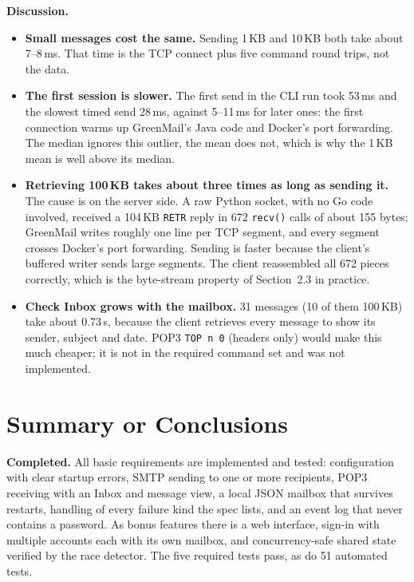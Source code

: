 \documentclass[11pt,a4paper]{article}
\begin{document}
\textbf{Discussion.}
\begin{itemize}
  \item \textbf{Small messages cost the same.} Sending 1\,KB and 10\,KB both take about
        7--8\,ms. That time is the TCP connect plus five command round trips, not the data.
  \item \textbf{The first session is slower.} The first send in the CLI run took 53\,ms and the
        slowest timed send 28\,ms, against 5--11\,ms for later ones: the first connection
        warms up GreenMail's Java code and Docker's port forwarding. The median ignores this
        outlier, the mean does not, which is why the 1\,KB mean is well above its median.
  \item \textbf{Retrieving 100\,KB takes about three times as long as sending it.} The cause is
        on the server side. A raw Python socket, with no Go code involved, received a
        104\,KB \texttt{RETR} reply in 672 \texttt{recv()} calls of about 155 bytes:
        GreenMail writes roughly one line per TCP segment, and every segment crosses Docker's
        port forwarding. Sending is faster because the client's buffered writer sends large
        segments. The client reassembled all 672 pieces correctly, which is the
        byte-stream property of Section~2.3 in practice.
  \item \textbf{Check Inbox grows with the mailbox.} 31 messages (10 of them 100\,KB) take
        about 0.73\,s, because the client retrieves every message to show its sender, subject
        and date. POP3 \texttt{TOP n 0} (headers only) would make this much cheaper; it is
        not in the required command set and was not implemented.
\end{itemize}

\section{Summary or Conclusions}

\textbf{Completed.} All basic requirements are implemented and tested: configuration with
clear startup errors, SMTP sending to one or more recipients, POP3 receiving with an Inbox and
message view, a local JSON mailbox that survives restarts, handling of every failure kind the
spec lists, and an event log that never contains a password. As bonus features there is a web
interface, sign-in with multiple accounts each with its own mailbox, and concurrency-safe
shared state verified by the race detector. The five required tests pass, as do 51 automated
tests.
\end{document}
